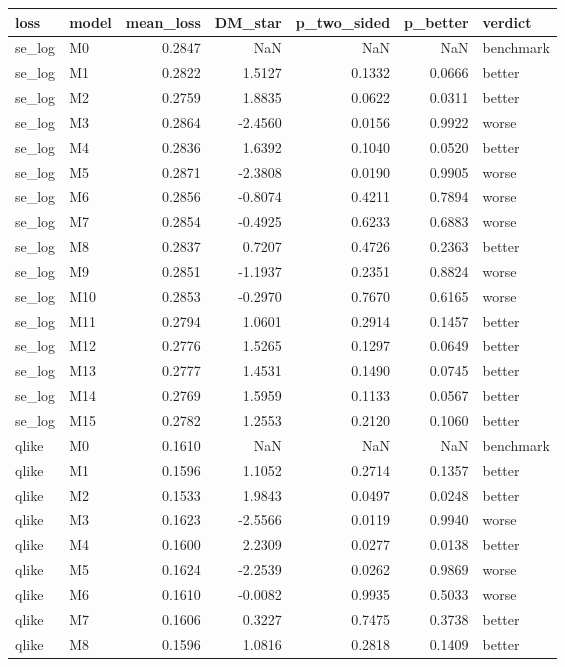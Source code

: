 \begin{tabular}{llrrrrl}
\toprule
loss & model & mean_loss & DM_star & p_two_sided & p_better & verdict \\
\midrule
se_log & M0 & 0.2847 & NaN & NaN & NaN & benchmark \\
se_log & M1 & 0.2822 & 1.5127 & 0.1332 & 0.0666 & better \\
se_log & M2 & 0.2759 & 1.8835 & 0.0622 & 0.0311 & better \\
se_log & M3 & 0.2864 & -2.4560 & 0.0156 & 0.9922 & worse \\
se_log & M4 & 0.2836 & 1.6392 & 0.1040 & 0.0520 & better \\
se_log & M5 & 0.2871 & -2.3808 & 0.0190 & 0.9905 & worse \\
se_log & M6 & 0.2856 & -0.8074 & 0.4211 & 0.7894 & worse \\
se_log & M7 & 0.2854 & -0.4925 & 0.6233 & 0.6883 & worse \\
se_log & M8 & 0.2837 & 0.7207 & 0.4726 & 0.2363 & better \\
se_log & M9 & 0.2851 & -1.1937 & 0.2351 & 0.8824 & worse \\
se_log & M10 & 0.2853 & -0.2970 & 0.7670 & 0.6165 & worse \\
se_log & M11 & 0.2794 & 1.0601 & 0.2914 & 0.1457 & better \\
se_log & M12 & 0.2776 & 1.5265 & 0.1297 & 0.0649 & better \\
se_log & M13 & 0.2777 & 1.4531 & 0.1490 & 0.0745 & better \\
se_log & M14 & 0.2769 & 1.5959 & 0.1133 & 0.0567 & better \\
se_log & M15 & 0.2782 & 1.2553 & 0.2120 & 0.1060 & better \\
qlike & M0 & 0.1610 & NaN & NaN & NaN & benchmark \\
qlike & M1 & 0.1596 & 1.1052 & 0.2714 & 0.1357 & better \\
qlike & M2 & 0.1533 & 1.9843 & 0.0497 & 0.0248 & better \\
qlike & M3 & 0.1623 & -2.5566 & 0.0119 & 0.9940 & worse \\
qlike & M4 & 0.1600 & 2.2309 & 0.0277 & 0.0138 & better \\
qlike & M5 & 0.1624 & -2.2539 & 0.0262 & 0.9869 & worse \\
qlike & M6 & 0.1610 & -0.0082 & 0.9935 & 0.5033 & worse \\
qlike & M7 & 0.1606 & 0.3227 & 0.7475 & 0.3738 & better \\
qlike & M8 & 0.1596 & 1.0816 & 0.2818 & 0.1409 & better \\

\end{tabular}
